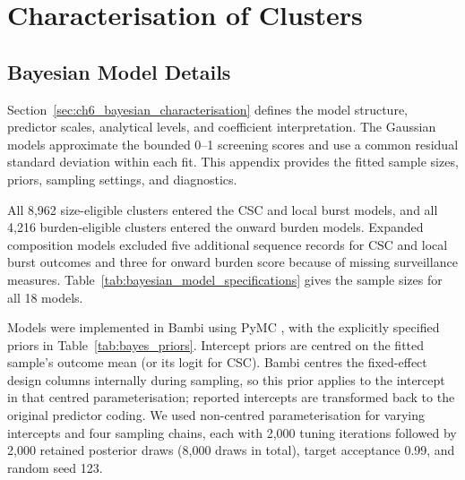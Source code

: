 \chapter{Characterisation of Clusters}\label{app:candidate_characterisation}

\section{Bayesian Model Details}\label{sec:app_ch6_bayesian_details}

Section~\ref{sec:ch6_bayesian_characterisation} defines the model structure, predictor scales, analytical levels, and coefficient interpretation. The Gaussian models approximate the bounded 0--1 screening scores and use a common residual standard deviation within each fit. This appendix provides the fitted sample sizes, priors, sampling settings, and diagnostics.

All 8,962 size-eligible clusters entered the CSC and local burst models, and all 4,216 burden-eligible clusters entered the onward burden models. Expanded composition models excluded five additional sequence records for CSC and local burst outcomes and three for onward burden score because of missing surveillance measures. Table~\ref{tab:bayesian_model_specifications} gives the sample sizes for all 18 models.

\begingroup
    \let\thesistablesetup\thesisdensetablesetup
    
\endgroup

Models were implemented in Bambi using PyMC \citep{Capretto2022,AbrilPla2023}, with the explicitly specified priors in Table~\ref{tab:bayes_priors}. Intercept priors are centred on the fitted sample's outcome mean (or its logit for CSC). Bambi centres the fixed-effect design columns internally during sampling, so this prior applies to the intercept in that centred parameterisation; reported intercepts are transformed back to the original predictor coding. We used non-centred parameterisation for varying intercepts and four sampling chains, each with 2,000 tuning iterations followed by 2,000 retained posterior draws (8,000 draws in total), target acceptance 0.99, and random seed 123.


